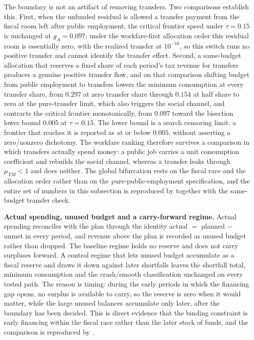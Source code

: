 \documentclass[review,12pt]{elsarticle}
\theoremstyle{plain}
\theoremstyle{definition}
\theoremstyle{remark}
\begin{document}
The boundary is not an artifact of removing transfers. Two comparisons establish this. First, when the unfunded residual is allowed a transfer payment from the fiscal room left after public employment, the critical frontier speed under $\tau=0.15$ is unchanged at $g_A=0.097$; under the workfare-first allocation order this residual room is essentially zero, with the realized transfer at $10^{-16}$, so this switch runs no positive transfer and cannot identify the transfer effect. Second, a same-budget allocation that reserves a fixed share of each period's tax revenue for transfers produces a genuine positive transfer flow, and on that comparison shifting budget from public employment to transfers lowers the minimum consumption at every transfer share, from $0.297$ at zero transfer share through $0.154$ at half share to zero at the pure-transfer limit, which also triggers the social channel, and contracts the critical frontier monotonically, from $0.097$ toward the bisection lower bound $0.005$ at $\tau=0.15$. The lower bound is a search censoring limit: a frontier that reaches it is reported as at or below $0.005$, without asserting a zero/nonzero dichotomy. The workfare ranking therefore survives a comparison in which transfers actually spend money: a public job carries a unit consumption coefficient and rebuilds the social channel, whereas a transfer leaks through $\mu_{TM}<1$ and does neither. The global bifurcation rests on the fiscal race and the allocation order rather than on the pure-public-employment specification, and the entire set of numbers in this subsection is reproduced by  together with the same-budget transfer check.

\smallskip\noindent\textbf{Actual spending, unused budget and a carry-forward regime.}
Actual spending reconciles with the plan through the identity actual $=$ planned $-$ unmet in every period, and revenue above the plan is recorded as unused budget rather than dropped. The baseline regime holds no reserve and does not carry surpluses forward. A control regime that lets unused budget accumulate as a fiscal reserve and draws it down against later shortfalls leaves the shortfall total, minimum consumption and the crash/smooth classification unchanged on every tested path. The reason is timing: during the early periods in which the financing gap opens, no surplus is available to carry, so the reserve is zero when it would matter, while the large unused balances accumulate only later, after the boundary has been decided. This is direct evidence that the binding constraint is early financing within the fiscal race rather than the later stock of funds, and the comparison is reproduced by .
\end{document}
